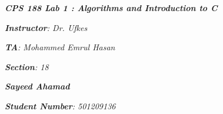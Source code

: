 

\begin{titlepage}
    \begin{center}
        \vspace*{1cm}
            
        \date{}
            
        \huge
            
        \textit{\textbf{CPS 188 Lab 1 : Algorithms and Introduction to C}}
            
        \vspace{0.25cm}
            
            
        \vspace{2.5cm}
            
		\vspace{0.25cm}
            
            
        \LARGE
            

		\textit{\textbf{Instructor}: Dr. Ufkes}

		\textit{\textbf{TA}: Mohammed Emrul Hasan}

		\textit{\textbf{Section}: 18}

		\vspace{2.5cm}

		\textit{\textbf{Sayeed Ahamad}}
            
            
        \Large         

		\vspace{5cm}

		\vspace{0cm}            
            
		\Large		
		        
		\vspace{0.25cm} 
		
		\textit{\textbf{Student Number}: 501209136}
            
        \vspace{2cm}
            
        \Large
         
		\vspace{0.25cm}                  
            
        \vspace{0.25cm}
           
            
    \end{center}
\end{titlepage}



